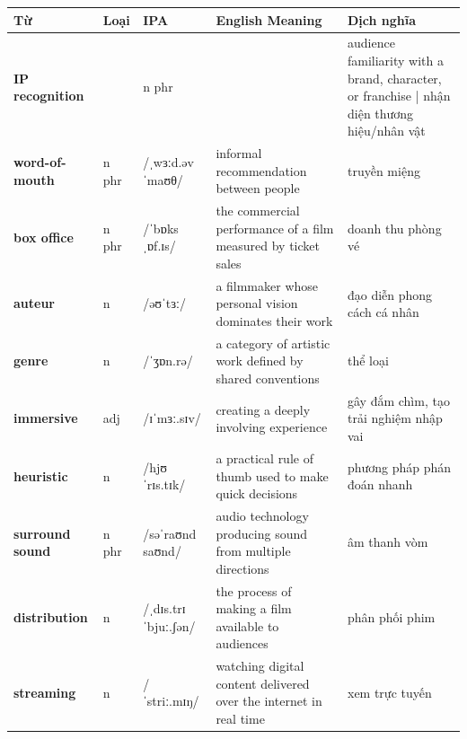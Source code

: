 \separator


\vspace{0.8em}
\begin{center}
\renewcommand{\arraystretch}{1.65}
\begin{tabularx}{\textwidth}{|V{0.22\textwidth}|C{0.07\textwidth}|I{0.20\textwidth}|Y|V{0.18\textwidth}|}
\hline
{}
\textbf{Từ} & \textbf{Loại} & \textbf{IPA} & \textbf{English Meaning} & \textbf{Dịch nghĩa} \\
\hline
\textbf{IP recognition} & & n phr & & audience familiarity with a brand, character, or franchise | nhận diện thương hiệu/nhân vật \\ \hline
\textbf{word-of-mouth} & n phr & /ˌwɜːd.əvˈmaʊθ/ & informal recommendation between people & truyền miệng \\ \hline
\textbf{box office} & n phr & /ˈbɒks ˌɒf.ɪs/ & the commercial performance of a film measured by ticket sales & doanh thu phòng vé \\ \hline
\textbf{auteur} & n & /əʊˈtɜː/ & a filmmaker whose personal vision dominates their work & đạo diễn phong cách cá nhân \\ \hline
\textbf{genre} & n & /ˈʒɒn.rə/ & a category of artistic work defined by shared conventions & thể loại \\ \hline
\textbf{immersive} & adj & /ɪˈmɜː.sɪv/ & creating a deeply involving experience & gây đắm chìm, tạo trải nghiệm nhập vai \\ \hline
\textbf{heuristic} & n & /hjʊˈrɪs.tɪk/ & a practical rule of thumb used to make quick decisions & phương pháp phán đoán nhanh \\ \hline
\textbf{surround sound} & n phr & /səˈraʊnd saʊnd/ & audio technology producing sound from multiple directions & âm thanh vòm \\ \hline
\textbf{distribution} & n & /ˌdɪs.trɪˈbjuː.ʃən/ & the process of making a film available to audiences & phân phối phim \\ \hline
\textbf{streaming} & n & /ˈstriː.mɪŋ/ & watching digital content delivered over the internet in real time & xem trực tuyến \\ \hline
\end{tabularx}
\end{center}

\newpage

